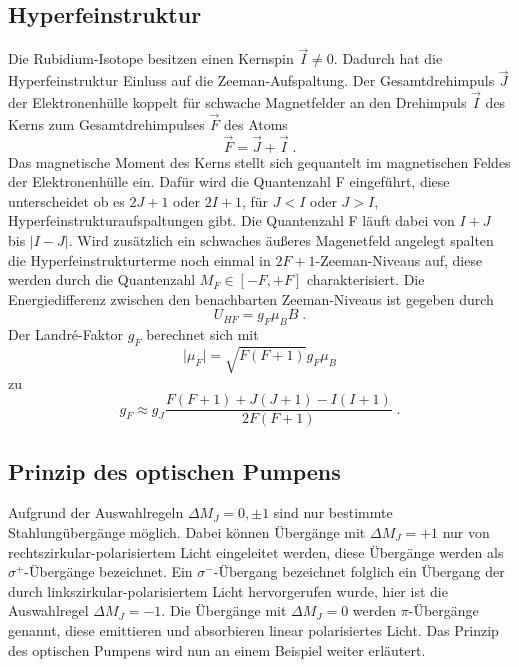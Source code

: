 \subsection{Hyperfeinstruktur}
Die Rubidium-Isotope besitzen einen Kernspin $\vec{I} \neq 0$. Dadurch hat die Hyperfeinstruktur
Einluss auf die Zeeman-Aufspaltung. Der Gesamtdrehimpuls $\vec{J}$ der Elektronenhülle koppelt
für schwache Magnetfelder an den Drehimpuls $\vec{I}$ des Kerns zum Gesamtdrehimpulses $\vec{F}$
des Atoms
\begin{equation}
\vec{F} = \vec{J} + \vec{I} \; .
\label{eq:F}
\end{equation}
Das magnetische Moment des Kerns stellt sich gequantelt im magnetischen Feldes der Elektronenhülle
ein. Dafür wird die Quantenzahl F eingeführt, diese unterscheidet ob es $2J+1$ oder $2I+1$,
für $J<I$ oder $J>I$, Hyperfeinstrukturaufspaltungen gibt. Die Quantenzahl F läuft dabei
von $I+J$ bis $\lvert I-J \rvert$. Wird zusätzlich ein schwaches äußeres Magenetfeld angelegt
spalten die Hyperfeinstrukturterme noch einmal in $2F+1$-Zeeman-Niveaus auf, diese werden durch
die Quantenzahl $M_F \in [-F,+F]$ charakterisiert. Die Energiedifferenz zwischen den benachbarten
Zeeman-Niveaus ist gegeben durch
\begin{equation}
U_{HF} = g_F \mu_B B \; .
\label{eq:UHF}
\end{equation}
Der Landr\'{e}-Faktor $g_F$ berechnet sich mit
\begin{equation}
\lvert \mu_F \rvert = \sqrt{F(F+1)} g_F \mu_B
\label{eq:muF}
\end{equation}
zu
\begin{equation}
g_F \approx g_J \frac{F(F+1) + J(J+1) -I(I+1)}{2F(F+1)} \; .
\label{eq:gF}
\end{equation}

\subsection{Prinzip des optischen Pumpens}
Aufgrund der Auswahlregeln $\Delta M_J = 0, \pm 1$ sind nur bestimmte Stahlungübergänge möglich.
Dabei können Übergänge mit $\Delta M_J = +1$ nur von rechtszirkular-polarisiertem Licht
eingeleitet werden, diese Übergänge werden als $\sigma^+$-Übergänge bezeichnet. Ein
$\sigma^-$-Übergang bezeichnet folglich ein Übergang der durch linkszirkular-polarisiertem
Licht hervorgerufen wurde, hier ist die Auswahlregel $\Delta M_J = -1$. Die Übergänge mit
$\Delta M_J = 0$ werden $\pi$-Übergänge genannt, diese emittieren und absorbieren
linear polarisiertes Licht. Das Prinzip des optischen Pumpens wird nun an einem
Beispiel weiter erläutert.
